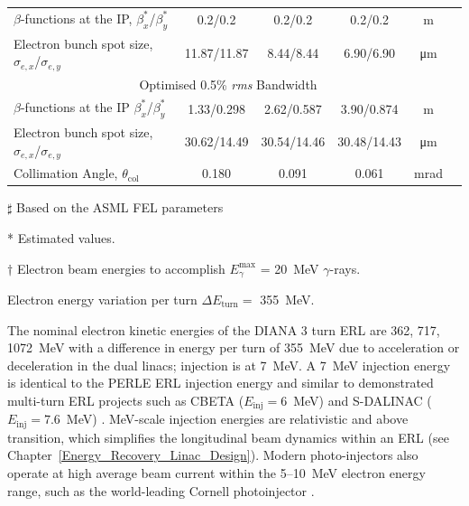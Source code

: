\documentclass[../main.tex]{subfiles}
\begin{document}
\begin{table}[!h]
\begin{threeparttable}
{\begin{tabular}{lccccc}
\hline
$\beta$-functions at the IP, $\beta_{x}^{*}$/$\beta_{y}^{*}$ & 0.2/0.2 & 0.2/0.2 & 0.2/0.2 & \si{\meter} \\
Electron bunch spot size, $\sigma_{e,x}$/$\sigma_{e,y}$ & 11.87/11.87 & 8.44/8.44 & 6.90/6.90 & \si{\micro\meter}\\
\hline\multicolumn{5}{c}{Optimised 0.5\% \textit{rms} Bandwidth} \\
\hline
$\beta$-functions at the IP $\beta_{x}^{*}$/$\beta_{y}^{*}$ & 1.33/0.298 & 2.62/0.587 & 3.90/0.874 & \si{\meter} \\
Electron bunch spot size, $\sigma_{e,x}$/$\sigma_{e,y}$ & 30.62/14.49 & 30.54/14.46 & 30.48/14.43 & \si{\micro\meter}\\
Collimation Angle, $\theta_{\mathrm{col}}$ & 0.180 & 0.091 & 0.061 & \si{\milli\radian} \\ 
\hline\hline
\end{tabular}}
\begin{tablenotes}
\item[$\sharp$]{Based on the ASML FEL parameters \cite{akkermans2017compact}}
\item[*]{Estimated values.}
\item[$\dagger$]{Electron beam energies to accomplish $E_{\gamma}^{\mathrm{max}}$ = 20~\si{\mega\electronvolt} $\gamma$-rays.}
\item{Electron energy variation per turn $\Delta E_{\mathrm{turn}} =$ 355~\si{\mega\electronvolt}.}
\end{tablenotes}
\end{threeparttable}
\label{tab:DIANA_electron_beam_design_parameters}
\end{table}

The nominal electron kinetic energies of the DIANA 3 turn ERL are 362, 717, 1072~\si{\mega\electronvolt} with a difference in energy per turn of 355~\si{\mega\electronvolt} due to acceleration or deceleration in the dual linacs; injection is at 7~\si{\mega\electronvolt}. A 7~\si{\mega\electronvolt} injection energy is identical to the PERLE \cite{angal2018perle} ERL injection energy and similar to demonstrated multi-turn ERL projects such as CBETA ($E_{\mathrm{inj}}=6$~\si{\mega\electronvolt}) \cite{bartnik2020cbeta} and S-DALINAC ($E_{\mathrm{inj}}=7.6$~\si{\mega\electronvolt}) \cite{arnold2018first}. \si{\mega\electronvolt}-scale injection energies are relativistic and above transition, which simplifies the longitudinal beam dynamics within an ERL (see Chapter~\ref{Energy_Recovery_Linac_Design}). Modern photo-injectors also operate at high average beam current within the 5--10~\si{\mega\electronvolt} electron energy range, such as the world-leading Cornell photoinjector \cite{bartnik2015operational}. 
\end{document}
